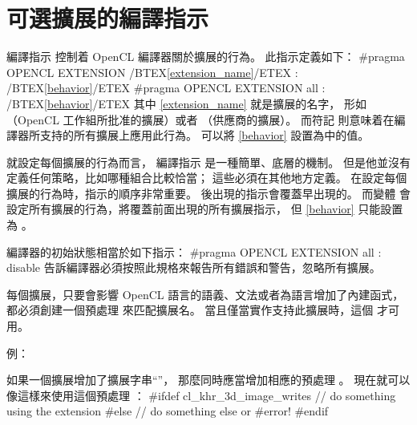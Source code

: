 \section{可選擴展的編譯指示}

編譯指示  控制着 OpenCL 編譯器關於擴展的行為。
此指示定義如下：
\startclc[indentnext=no]
#pragma OPENCL EXTENSION /BTEX\cref{extension_name}/ETEX : /BTEX\cref{behavior}/ETEX
#pragma OPENCL EXTENSION all : /BTEX\cref{behavior}/ETEX
\stopclc
其中 \cref{extension_name} 就是擴展的名字，
形如 （OpenCL 工作組所批准的擴展）或者 （供應商的擴展）。
而符記  則意味着在編譯器所支持的所有擴展上應用此行為。
可以將 \cref{behavior} 設置為中的值。

{}

就設定每個擴展的行為而言，
編譯指示  是一種簡單、底層的機制。
但是他並沒有定義任何策略，比如哪種組合比較恰當；
這些必須在其他地方定義。
在設定每個擴展的行為時，指示的順序非常重要。
後出現的指示會覆蓋早出現的。
而變體  會設定所有擴展的行為，將覆蓋前面出現的所有擴展指示，
但 \cref{behavior} 只能設置為 。

編譯器的初始狀態相當於如下指示：
\startclc[indentnext=no]
#pragma OPENCL EXTENSION all : disable
\stopclc
告訴編譯器必須按照此規格來報告所有錯誤和警告，忽略所有擴展。

每個擴展，只要會影響 OpenCL 語言的語義、文法或者為語言增加了內建函式，
都必須創建一個預處理  來匹配擴展名。
當且僅當實作支持此擴展時，這個  才可用。

例：

如果一個擴展增加了擴展字串“”，
那麼同時應當增加相應的預處理 。
現在就可以像這樣來使用這個預處理 ：
\startclc
#ifdef cl_khr_3d_image_writes
	// do something using the extension
#else
	// do something else or #error!
#endif
\stopclc
